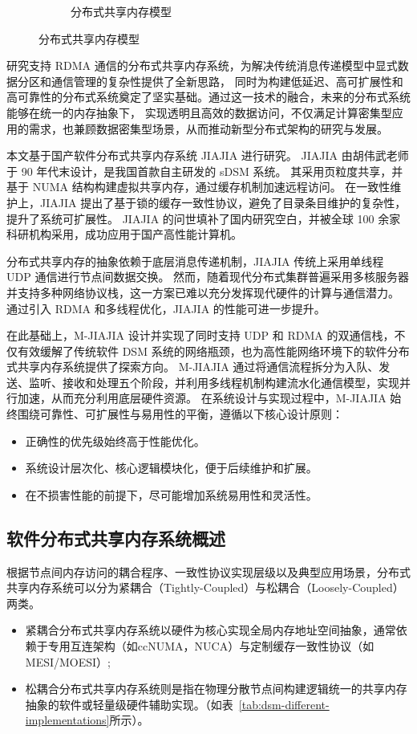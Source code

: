 {\begin{figure}[!htbp]
\begin{subfigure}[b]{0.6\textwidth}
      \caption{分布式共享内存模型}
      \label{fig:dsm}
    \end{subfigure}
    \label{fig:model}
  \end{figure}

  研究支持 RDMA 通信的分布式共享内存系统，为解决传统消息传递模型中显式数据分区和通信管理的复杂性提供了全新思路，
  同时为构建低延迟、高可扩展性和高可靠性的分布式系统奠定了坚实基础。通过这一技术的融合，未来的分布式系统能够在统一的内存抽象下，
  实现透明且高效的数据访问，不仅满足计算密集型应用的需求，也兼顾数据密集型场景，从而推动新型分布式架构的研究与发展。

  本文基于国产软件分布式共享内存系统 JIAJIA\citep{huweiwu2001sma,huweiwu2024ca,1999huweiwuJIAJIA} 进行研究。
  JIAJIA 由胡伟武老师于 90 年代末设计，是我国首款自主研发的 sDSM 系统。
  其采用页粒度共享，并基于 NUMA 结构构建虚拟共享内存，通过缓存机制加速远程访问。
  在一致性维护上，JIAJIA 提出了基于锁的缓存一致性协议，避免了目录条目维护的复杂性，提升了系统可扩展性。
  JIAJIA 的问世填补了国内研究空白，并被全球 100 余家科研机构采用，成功应用于国产高性能计算机。

  分布式共享内存的抽象依赖于底层消息传递机制，JIAJIA 传统上采用单线程 UDP 通信进行节点间数据交换。
  然而，随着现代分布式集群普遍采用多核服务器并支持多种网络协议栈，这一方案已难以充分发挥现代硬件的计算与通信潜力。
  通过引入 RDMA 和多线程优化，JIAJIA 的性能可进一步提升。

  在此基础上，M-JIAJIA 设计并实现了同时支持 UDP 和 RDMA 的双通信栈，不仅有效缓解了传统软件 DSM 系统的网络瓶颈，也为高性能网络环境下的软件分布式共享内存系统提供了探索方向。
  M-JIAJIA 通过将通信流程拆分为入队、发送、监听、接收和处理五个阶段，并利用多线程机制构建流水化通信模型，实现并行加速，从而充分利用底层硬件资源。
  在系统设计与实现过程中，M-JIAJIA 始终围绕可靠性、可扩展性与易用性的平衡，遵循以下核心设计原则：

  \begin{itemize}
    \item 正确性的优先级始终高于性能优化。
    \item 系统设计层次化、核心逻辑模块化，便于后续维护和扩展。
    \item 在不损害性能的前提下，尽可能增加系统易用性和灵活性。
  \end{itemize}

  \subsection{软件分布式共享内存系统概述}
  根据节点间内存访问的耦合程序、一致性协议实现层级以及典型应用场景，分布式共享内存系统可以分为紧耦合（Tightly-Coupled）与松耦合（Loosely-Coupled）两类。
  \begin{itemize}
    \item 紧耦合分布式共享内存系统以硬件为核心实现全局内存地址空间抽象，通常依赖于专用互连架构（如ccNUMA，NUCA）与定制缓存一致性协议（如MESI/MOESI）;
    \item 松耦合分布式共享内存系统则是指在物理分散节点间构建逻辑统一的共享内存抽象的软件或轻量级硬件辅助实现。（如表~\ref{tab:dsm-different-implementations}所示）。
  \end{itemize}

}
